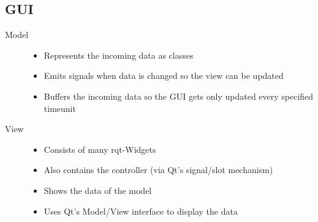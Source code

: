 \subsection{GUI}

\begin{description}
	\item[Model]	
		\begin{itemize}
		\item Represents the incoming data as classes
		\item Emits signals when data is changed so the view can be updated
		\item Buffers the incoming data so the GUI gets only updated every specified timeunit
		\end{itemize}
	\item[View]
		\begin{itemize}
		\item Consists of many rqt-Widgets
		\item Also contains the controller (via Qt's signal/slot mechanism)
		\item Shows the data of the model
		\item Uses Qt's Model/View interface to display the data
		\end{itemize}
\end{description}